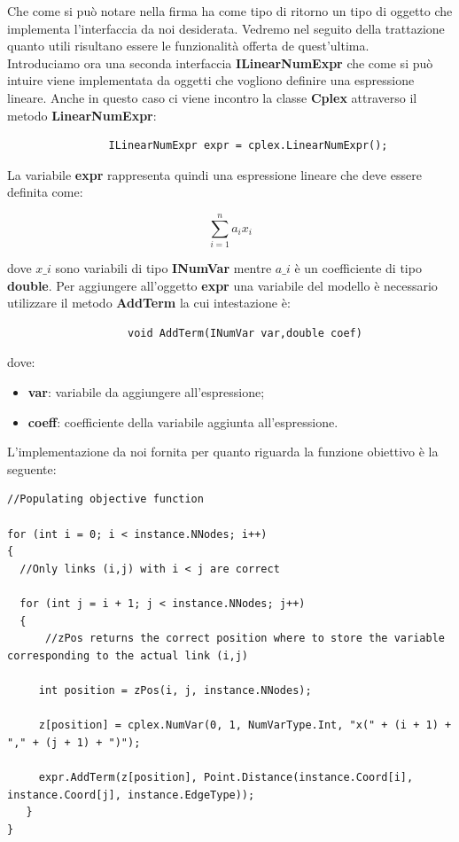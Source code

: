 \documentclass[11pt]{article}
\begin{document}
Che come si può notare nella firma ha come tipo di ritorno un tipo di oggetto che implementa l'interfaccia da noi desiderata. Vedremo nel seguito della trattazione quanto utili risultano essere le funzionalità offerta de quest'ultima.\\
Introduciamo ora una seconda interfaccia \textbf{ILinearNumExpr} che come si può intuire viene implementata da oggetti che vogliono definire una espressione lineare. Anche in questo caso ci viene incontro la classe \textbf{Cplex} attraverso il metodo \textbf{LinearNumExpr}:
\begin{lstlisting}
                ILinearNumExpr expr = cplex.LinearNumExpr();
\end{lstlisting}

La variabile \textbf{expr} rappresenta quindi una espressione lineare che deve essere definita come:

$$\displaystyle{\sum_{i = 1}^n a_i x_i} $$

dove \textbf{$x\_i$} sono variabili di tipo \textbf{INumVar} mentre \textbf{$a\_i$} è un coefficiente di tipo \textbf{double}. Per aggiungere all'oggetto \textbf{expr} una variabile del modello è necessario utilizzare il metodo \textbf{AddTerm} la cui intestazione è:

\begin{lstlisting}
                   void AddTerm(INumVar var,double coef)
\end{lstlisting}

dove:

\begin{itemize}
\item \textbf{var}: variabile da aggiungere all'espressione;
\item  \textbf{coeff}: coefficiente della variabile aggiunta all'espressione.
\end{itemize}

L'implementazione da noi fornita per quanto riguarda la funzione obiettivo è la seguente:

\begin{lstlisting}
//Populating objective function

for (int i = 0; i < instance.NNodes; i++)
{
  //Only links (i,j) with i < j are correct
  
  for (int j = i + 1; j < instance.NNodes; j++)
  {
      //zPos returns the correct position where to store the variable corresponding to the actual link (i,j)
           
     int position = zPos(i, j, instance.NNodes);
           
     z[position] = cplex.NumVar(0, 1, NumVarType.Int, "x(" + (i + 1) + "," + (j + 1) + ")");
         
     expr.AddTerm(z[position], Point.Distance(instance.Coord[i], instance.Coord[j], instance.EdgeType));      
   }
}

\end{lstlisting}
\end{document}
